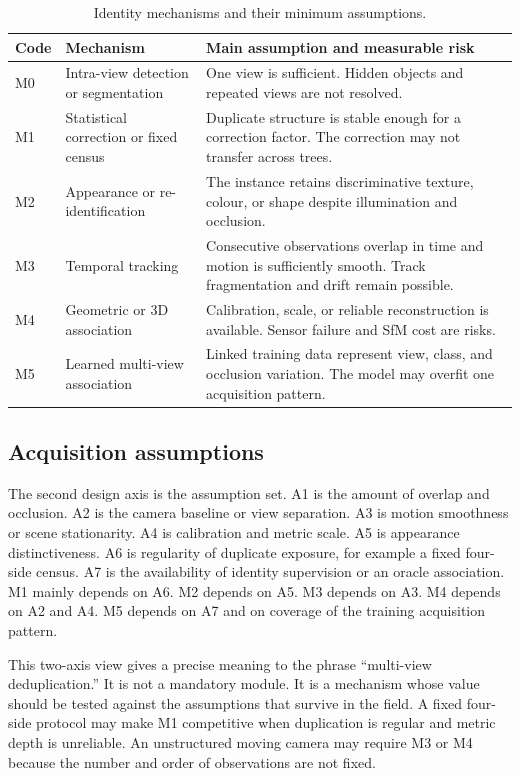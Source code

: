 \begin{table}[t]
\centering
\caption{Identity mechanisms and their minimum assumptions.}
\label{tab:mechanisms2}
\small
\begin{tabularx}{\columnwidth}{@{}lY Y@{}}
\toprule
Code & Mechanism & Main assumption and measurable risk\\
\midrule
M0 & Intra-view detection or segmentation & One view is sufficient. Hidden objects and repeated views are not resolved.\\
M1 & Statistical correction or fixed census & Duplicate structure is stable enough for a correction factor. The correction may not transfer across trees.\\
M2 & Appearance or re-identification & The instance retains discriminative texture, colour, or shape despite illumination and occlusion.\\
M3 & Temporal tracking & Consecutive observations overlap in time and motion is sufficiently smooth. Track fragmentation and drift remain possible.\\
M4 & Geometric or 3D association & Calibration, scale, or reliable reconstruction is available. Sensor failure and SfM cost are risks.\\
M5 & Learned multi-view association & Linked training data represent view, class, and occlusion variation. The model may overfit one acquisition pattern.\\
\bottomrule
\end{tabularx}
\end{table}

\subsection{Acquisition assumptions}

The second design axis is the assumption set. A1 is the amount of overlap and occlusion. A2 is the camera baseline or view separation. A3 is motion smoothness or scene stationarity. A4 is calibration and metric scale. A5 is appearance distinctiveness. A6 is regularity of duplicate exposure, for example a fixed four-side census. A7 is the availability of identity supervision or an oracle association. M1 mainly depends on A6. M2 depends on A5. M3 depends on A3. M4 depends on A2 and A4. M5 depends on A7 and on coverage of the training acquisition pattern.

This two-axis view gives a precise meaning to the phrase ``multi-view deduplication.'' It is not a mandatory module. It is a mechanism whose value should be tested against the assumptions that survive in the field. A fixed four-side protocol may make M1 competitive when duplication is regular and metric depth is unreliable. An unstructured moving camera may require M3 or M4 because the number and order of observations are not fixed.

